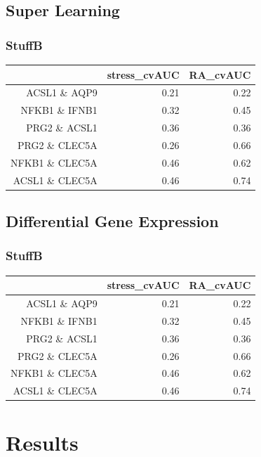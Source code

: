 \documentclass{beamer}
\begin{document}
\subsection{Super Learning}

\begin{frame}[fragile]
  	\frametitle{StuffB}
 		\begin{table}[ht]
  		\centering
  		\begin{tabular}{rrr}
   			\hline
   			& stress\_cvAUC & RA\_cvAUC \\ 
   			\hline
  			ACSL1 \& AQP9 & 0.21 & 0.22 \\ 
  			NFKB1 \& IFNB1 & 0.32 & 0.45 \\ 
  			PRG2 \& ACSL1 & 0.36 & 0.36 \\ 
  			PRG2 \& CLEC5A & 0.26 & 0.66 \\ 
  			NFKB1 \& CLEC5A & 0.46 & 0.62 \\ 
  			ACSL1 \& CLEC5A & 0.46 & 0.74 \\ 
   			\hline
		\end{tabular}
		\end{table}
\end{frame}

\subsection{Differential Gene Expression}

\begin{frame}[fragile]
  	\frametitle{StuffB}
 		\begin{table}[ht]
  		\centering
  		\begin{tabular}{rrr}
   			\hline
   			& stress\_cvAUC & RA\_cvAUC \\ 
   			\hline
  			ACSL1 \& AQP9 & 0.21 & 0.22 \\ 
  			NFKB1 \& IFNB1 & 0.32 & 0.45 \\ 
  			PRG2 \& ACSL1 & 0.36 & 0.36 \\ 
  			PRG2 \& CLEC5A & 0.26 & 0.66 \\ 
  			NFKB1 \& CLEC5A & 0.46 & 0.62 \\ 
  			ACSL1 \& CLEC5A & 0.46 & 0.74 \\ 
   			\hline
		\end{tabular}
		\end{table}
\end{frame}

\section{Results}
\end{document}
